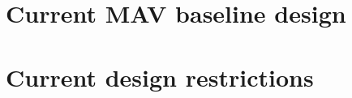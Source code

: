 
%
%
%
%
%
%


\section{Current \ac{MAV} baseline design}
\label{sec:curmavbas}

\section{Current design restrictions}
\label{sec:curdesres}






